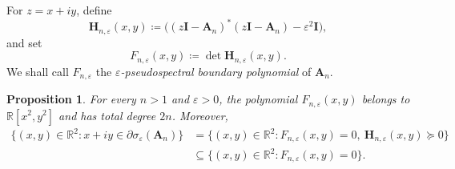 \documentclass[11pt]{article}
\newtheorem{proposition}[theorem]{Proposition}
\begin{document}
For \(z=x+iy\), define
\[
\mathbf{H}_{n,\varepsilon}(x,y)
\coloneqq
\bigl((z\mathbf{I}-\mathbf{A}_n)^*(z\mathbf{I}-\mathbf{A}_n)-\varepsilon^2\mathbf{I}\bigr),
\]
and set
\[
F_{n,\varepsilon}(x,y)\coloneqq \det \mathbf{H}_{n,\varepsilon}(x,y).
\]
We shall call \(F_{n,\varepsilon}\) the \emph{\(\varepsilon\)-pseudospectral boundary polynomial}
of \(\mathbf{A}_n\).

\begin{proposition}\label{prop:boundary-polynomial}
For every \(n>1\) and \(\varepsilon>0\), the polynomial \(F_{n,\varepsilon}(x,y)\) belongs to
\(\mathbb{R}[x^2,y^2]\) and has total degree \(2n\). Moreover,
\[
\begin{aligned}
\bigl\{(x,y)\in\mathbb{R}^2:x+iy\in \partial\sigma_\varepsilon(\mathbf{A}_n)\bigr\}
&=\bigl\{(x,y)\in\mathbb{R}^2:F_{n,\varepsilon}(x,y)=0,\ \mathbf{H}_{n,\varepsilon}(x,y)\succeq 0\bigr\} \\
&\subseteq \bigl\{(x,y)\in\mathbb{R}^2:F_{n,\varepsilon}(x,y)=0\bigr\}.
\end{aligned}
\]
\end{proposition}
\end{document}
